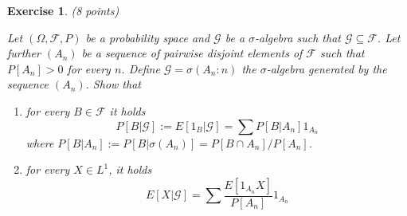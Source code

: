 \documentclass[DIV=classic,a4paper,10pt]{scrartcl}
\newtheorem{exercise}[theorem]{Exercise}
\theoremstyle{nonumberplain}
\numberwithin{equation}{section}
\begin{document}
\begin{exercise}(8 points)


    Let $(\Omega,\mathcal{F},P)$ be a probability space and $\mathcal{G}$ be a $\sigma$-algebra such that $\mathcal{G}\subseteq \mathcal{F}$.
    Let further $(A_n)$ be a sequence of pairwise disjoint elements of $\mathcal{F}$ such that $P[A_n]>0$ for every $n$.
    Define $\mathcal{G}=\sigma(A_n\colon n)$ the $\sigma$-algebra generated by the sequence $(A_n)$.
    Show that
    \begin{enumerate}[label=\textit{(\roman*)}]
        \item for every $B \in \mathcal{F}$ it holds
            \begin{equation*}
                P\left[ B|\mathcal{G} \right]:=E\left[ 1_B |\mathcal{G} \right]=\sum P\left[ B |A_n \right]1_{A_n}
            \end{equation*}
            where $P[B|A_n]:=P[B|\sigma(A_n)]=P[B\cap A_n]/P[A_n]$.
        \item for every $X \in L^1$, it holds
            \begin{equation*}
                E\left[ X|\mathcal{G} \right]=\sum \frac{E\left[ 1_{A_n}X \right]}{P[A_n]}1_{A_n}
            \end{equation*}
    \end{enumerate}
    
\end{exercise}
\end{document}
